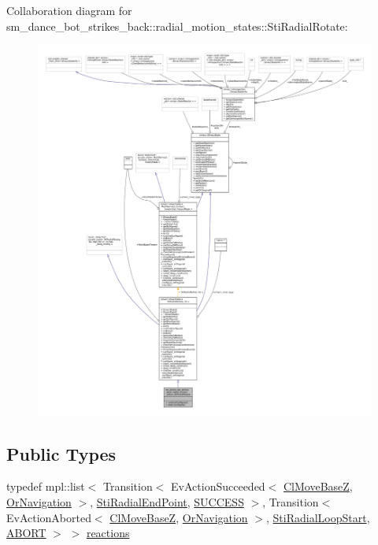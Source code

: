 Collaboration diagram for sm\+\_\+dance\+\_\+bot\+\_\+strikes\+\_\+back\+:\+:radial\+\_\+motion\+\_\+states\+:\+:Sti\+Radial\+Rotate\+:
\nopagebreak
\begin{figure}[H]
\begin{center}
\leavevmode
\includegraphics[width=350pt]{structsm__dance__bot__strikes__back_1_1radial__motion__states_1_1StiRadialRotate__coll__graph}
\end{center}
\end{figure}
\subsection*{Public Types}
\begin{DoxyCompactItemize}
\item 
typedef mpl\+::list$<$ Transition$<$ Ev\+Action\+Succeeded$<$ \hyperlink{classcl__move__base__z_1_1ClMoveBaseZ}{Cl\+Move\+BaseZ}, \hyperlink{classsm__dance__bot__strikes__back_1_1OrNavigation}{Or\+Navigation} $>$, \hyperlink{structsm__dance__bot__strikes__back_1_1radial__motion__states_1_1StiRadialEndPoint}{Sti\+Radial\+End\+Point}, \hyperlink{classSUCCESS}{S\+U\+C\+C\+E\+SS} $>$, Transition$<$ Ev\+Action\+Aborted$<$ \hyperlink{classcl__move__base__z_1_1ClMoveBaseZ}{Cl\+Move\+BaseZ}, \hyperlink{classsm__dance__bot__strikes__back_1_1OrNavigation}{Or\+Navigation} $>$, \hyperlink{structsm__dance__bot__strikes__back_1_1radial__motion__states_1_1StiRadialLoopStart}{Sti\+Radial\+Loop\+Start}, \hyperlink{classABORT}{A\+B\+O\+RT} $>$ $>$ \hyperlink{structsm__dance__bot__strikes__back_1_1radial__motion__states_1_1StiRadialRotate_a22c80365135cc2cff04dbd1f102c3575}{reactions}
\end{DoxyCompactItemize}
